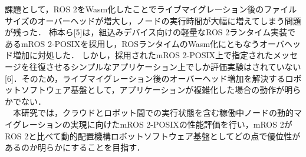 \documentclass[11pt]{ujarticle}
\begin{document}
課題として，ROS 2をWasm化したことでライブマイグレーション後のファイルサイズのオーバーヘッドが増大し，ノードの実行時間が大幅に増えてしまう問題が残った．
柿本ら[5]は，組込みデバイス向けの軽量なROS 2ランタイム実装であるmROS 2-POSIXを採用し，ROSランタイムのWasm化にともなうオーバヘッド増加に対処した．
しかし，採用されたmROS 2-POSIX上で指定されたメッセージを往復させるシンプルなアプリケーション上でしか評価実験はされていない[6]．そのため，ライブマイグレーション後のオーバーヘッド増加を解決するロボットソフトウェア基盤として，アプリケーションが複雑化した場合の動作が明らかでない．
\\　本研究では，クラウドとロボット間での実行状態を含む稼働中ノードの動的マイグレーションの実現に向けたmROS 2-POSIXの性能評価を行い，mROS 2がROS 2と比べて動的配置機構ロボットソフトウェア基盤としてどの点で優位性があるのか明らかにすることを目指す．
\end{document}

